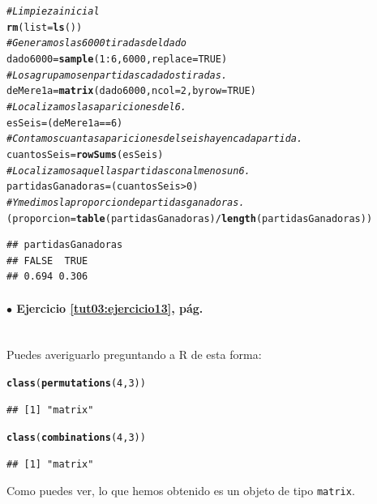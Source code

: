 \documentclass[10pt,a4paper]{article}\usepackage[]{graphicx}\usepackage[]{color}
\makeatletter
\newcommand{\hlnum}[1]{\textcolor[rgb]{0.686,0.059,0.569}{#1}}%
\newcommand{\hlcom}[1]{\textcolor[rgb]{0.678,0.584,0.686}{\textit{#1}}}%
\newcommand{\hlopt}[1]{\textcolor[rgb]{0,0,0}{#1}}%
\newcommand{\hlstd}[1]{\textcolor[rgb]{0.345,0.345,0.345}{#1}}%
\newcommand{\hlkwb}[1]{\textcolor[rgb]{0.69,0.353,0.396}{#1}}%
\newcommand{\hlkwc}[1]{\textcolor[rgb]{0.333,0.667,0.333}{#1}}%
\newcommand{\hlkwd}[1]{\textcolor[rgb]{0.737,0.353,0.396}{\textbf{#1}}}%
\newenvironment{kframe}{%
 \def\at@end@of@kframe{}%
 \ifinner\ifhmode%
  \def\at@end@of@kframe{\end{minipage}}%
  \begin{minipage}{\columnwidth}%
 \fi\fi%
 \def\FrameCommand##1{\hskip\@totalleftmargin \hskip-\fboxsep
 \colorbox{shadecolor}{##1}\hskip-\fboxsep
     \hskip-\linewidth \hskip-\@totalleftmargin \hskip\columnwidth}%
 \MakeFramed {\advance\hsize-\width
   \@totalleftmargin\z@ \linewidth\hsize
   \@setminipage}}%
 {\par\unskip\endMakeFramed%
 \at@end@of@kframe}
\newenvironment{knitrout}{}{} %
\makeatother
\begin{document}
\begin{knitrout}
\color{fgcolor}\begin{kframe}
\begin{alltt}
\hlcom{# Limpieza inicial}
\hlkwd{rm}\hlstd{(}\hlkwc{list}\hlstd{=}\hlkwd{ls}\hlstd{())}
\hlcom{# Generamos las 6000 tiradas del dado}
\hlstd{dado6000} \hlkwb{=} \hlkwd{sample}\hlstd{(}\hlnum{1}\hlopt{:}\hlnum{6}\hlstd{,} \hlnum{6000}\hlstd{,} \hlkwc{replace} \hlstd{=} \hlnum{TRUE}\hlstd{)}
\hlcom{# Los agrupamos en partidas cada dos tiradas.}
\hlstd{deMere1a} \hlkwb{=} \hlkwd{matrix}\hlstd{(dado6000 ,} \hlkwc{ncol} \hlstd{=} \hlnum{2}\hlstd{,} \hlkwc{byrow} \hlstd{=} \hlnum{TRUE}\hlstd{)}
\hlcom{# Localizamos las apariciones del 6.}
\hlstd{esSeis} \hlkwb{=} \hlstd{(deMere1a} \hlopt{==} \hlnum{6}\hlstd{)}
\hlcom{# Contamos cuantas apariciones del seis hay en cada partida.}
\hlstd{cuantosSeis} \hlkwb{=} \hlkwd{rowSums}\hlstd{(esSeis)}
\hlcom{# Localizamos aquellas partidas con al menos un 6.}
\hlstd{partidasGanadoras} \hlkwb{=} \hlstd{(cuantosSeis} \hlopt{>} \hlnum{0}\hlstd{)}
\hlcom{# Y medimos la proporcion de partidas ganadoras.}
\hlstd{(proporcion} \hlkwb{=} \hlkwd{table}\hlstd{(partidasGanadoras)}\hlopt{/}\hlkwd{length}\hlstd{(partidasGanadoras))}
\end{alltt}
\begin{verbatim}
## partidasGanadoras
## FALSE  TRUE 
## 0.694 0.306
\end{verbatim}
\end{kframe}
\end{knitrout}


\paragraph{\bf $\bullet$ Ejercicio \ref{tut03:ejercicio13}, pág. \pageref{tut03:ejercicio13}}
\label{tut03:ejercicio13:sol}\quad\\

Puedes averiguarlo preguntando a R de esta forma:
\begin{knitrout}
\color{fgcolor}\begin{kframe}
\begin{alltt}
\hlkwd{class}\hlstd{(}\hlkwd{permutations}\hlstd{(}\hlnum{4}\hlstd{,}\hlnum{3}\hlstd{) )}
\end{alltt}
\begin{verbatim}
## [1] "matrix"
\end{verbatim}
\begin{alltt}
\hlkwd{class}\hlstd{(}\hlkwd{combinations}\hlstd{(}\hlnum{4}\hlstd{,}\hlnum{3}\hlstd{) )}
\end{alltt}
\begin{verbatim}
## [1] "matrix"
\end{verbatim}
\end{kframe}
\end{knitrout}
Como puedes ver, lo que hemos obtenido es un objeto de tipo {\tt matrix}.
\end{document}
